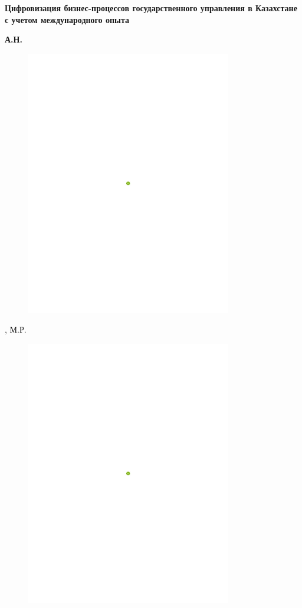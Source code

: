 
{\bfseries Цифровизация бизнес-процессов государственного управления в
Казахстане с учетом международного опыта}

{\bfseries А.Н.
\begin{figure}[H]
	\centering
	\includegraphics[width=0.8\textwidth]{media/ekon3/image3}
	\caption*{}
\end{figure}

, М.Р.
\begin{figure}[H]
	\centering
	\includegraphics[width=0.8\textwidth]{media/ekon3/image3}
	\caption*{}
\end{figure}


}
